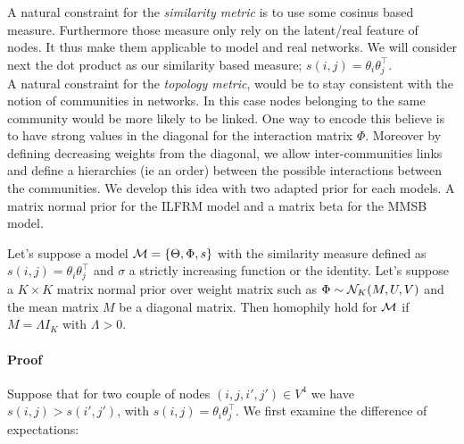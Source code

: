 A natural constraint for the \emph{similarity metric} is to use some cosinus based measure. Furthermore those measure only rely on the latent/real feature of nodes. It thus make them applicable to model and real networks. We will consider next the dot product as our similarity based measure; $s(i,j) = \theta_i \theta_j^\top$.~\\

A natural constraint for the \emph{topology metric}, would be to stay consistent with the notion of communities in networks. In this case nodes belonging to the same community would be more likely to be linked. One way to encode this believe is to have strong values in the diagonal for the interaction matrix $\Phi$. Moreover by defining decreasing weights from the diagonal, we allow inter-communities links and define a hierarchies (ie an order) between the possible interactions between the communities. We develop this idea with two adapted prior for each models. A matrix normal prior for the ILFRM model and a matrix beta for the MMSB model.~\\


\begin{proposition}[] \label{prop:hom_mn}
Let's suppose a model $ \mathcal{M}=\{\Theta, \Phi, s\}$ with the similarity measure defined as $s(i,j) = \theta_i \theta_j^\top$ and $\sigma$ a strictly increasing function or the identity. Let's suppose a $K\times K$ matrix normal prior over weight matrix such as $\Phi \sim \mathcal{N}_K(M, U, V)$ and the mean matrix $M$ be a diagonal matrix. Then homophily hold for $\mathcal{M}$ if $M=\Lambda I_K$ with $\Lambda > 0$.
\end{proposition}
\paragraph{Proof} 
Suppose that for two couple of nodes $(i,j,i',j') \in V^4$ we have $s(i,j) > s(i',j')$, with $s(i,j) =\theta_i \theta_j^\top$. We first examine the difference of expectations:

